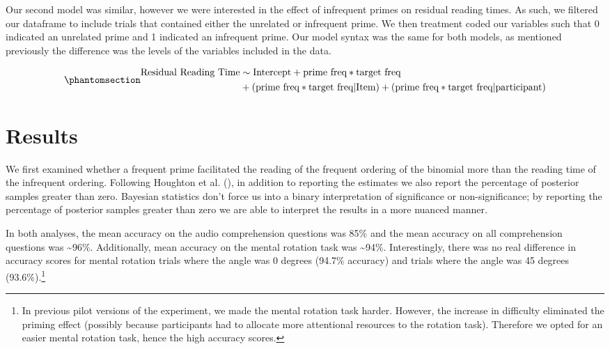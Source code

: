 \documentclass[
  12pt,
]{scrartcl}
\begin{document}
Our second model was similar, however we were interested in the effect
of infrequent primes on residual reading times. As such, we filtered our
dataframe to include trials that contained either the unrelated or
infrequent prime. We then treatment coded our variables such that 0
indicated an unrelated prime and 1 indicated an infrequent prime. Our
model syntax was the same for both models, as mentioned previously the
difference was the levels of the variables included in the data.

\begin{equation}\phantomsection\label{eq-models}{
\begin{aligned}
\text{Residual Reading Time} & \sim \text{Intercept} + \text{prime freq} * \text{target freq} \\ 
&+ (\text{prime freq} * \text{target freq} | \text{Item}) + (\text{prime freq} * \text{target freq} | \text{participant})
\end{aligned}
}\end{equation}

\section{Results}\label{results}

We first examined whether a frequent prime facilitated the reading of
the frequent ordering of the binomial more than the reading time of the
infrequent ordering. Following Houghton et al.
(),
in addition to reporting the estimates we also report the percentage of
posterior samples greater than zero. Bayesian statistics don't force us
into a binary interpretation of significance or non-significance; by
reporting the percentage of posterior samples greater than zero we are
able to interpret the results in a more nuanced manner.

In both analyses, the mean accuracy on the audio comprehension questions
was 85\% and the mean accuracy on all comprehension questions was
\textasciitilde96\%. Additionally, mean accuracy on the mental rotation
task was \textasciitilde94\%. Interestingly, there was no real
difference in accuracy scores for mental rotation trials where the angle
was 0 degrees (94.7\% accuracy) and trials where the angle was 45
degrees (93.6\%).\footnote{In previous pilot versions of the experiment,
  we made the mental rotation task harder. However, the increase in
  difficulty eliminated the priming effect (possibly because
  participants had to allocate more attentional resources to the
  rotation task). Therefore we opted for an easier mental rotation task,
  hence the high accuracy scores.}
\end{document}
